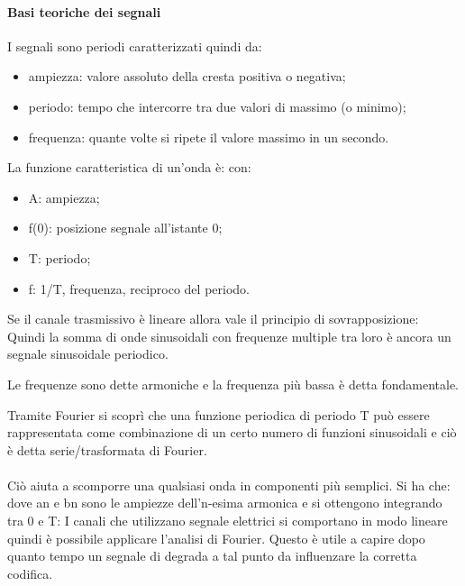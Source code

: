 \documentclass{subfiles}
\begin{document}
    \paragraph*{Basi teoriche dei segnali}
    I segnali sono periodi caratterizzati quindi da:\begin{itemize}
        \item ampiezza: valore assoluto della cresta positiva o negativa;
        \item periodo: tempo che intercorre tra due valori di massimo (o minimo);
        \item frequenza: quante volte si ripete il valore massimo in un secondo.
    \end{itemize}
    La funzione caratteristica di un'onda è: 
    con:
    \begin{itemize}
        \item A: ampiezza;
        \item f(0): posizione segnale all'istante 0;
        \item T: periodo;
        \item f: 1/T, frequenza, reciproco del periodo.
    \end{itemize}
    Se il canale trasmissivo è lineare allora vale il principio di sovrapposizione:\\
    Quindi la somma di onde sinusoidali con frequenze multiple tra loro è ancora un segnale sinusoidale periodico.
    \begin{Note*}
        Le frequenze sono dette armoniche e la frequenza più bassa è detta fondamentale.
    \end{Note*}
    Tramite Fourier si scoprì che una funzione periodica di periodo T può essere rappresentata come combinazione di un certo numero 
    di funzioni sinusoidali e ciò è detta serie/trasformata di Fourier.\\ \\
    Ciò aiuta a scomporre una qualsiasi onda in componenti più semplici. Si ha che: 
    dove an e bn sono le ampiezze dell'n-esima armonica e si ottengono integrando tra 0 e T:
    I canali che utilizzano segnale elettrici si comportano in modo lineare quindi è possibile applicare l'analisi di Fourier. Questo è 
    utile a capire dopo quanto tempo un segnale di degrada a tal punto da influenzare la corretta codifica.
\end{document}
